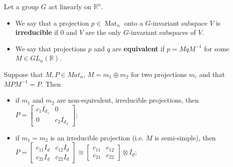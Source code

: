 \begin{frame}
  \begin{definition}
    Let a group $G$ act linearly on $\mathbb{R}^n$.
    \pause
    \begin{itemize}
      \item We say that a projection $p \in \operatorname{Mat}_n$ onto a $G$-invariant subspace $V$ is \textbf{irreducible}
      if $0$ and $V$ are the only $G$-invariant subspaces of $V$.
      \pause
      \item We say that projections $p$ and $q$ are \textbf{equivalent} if $p = MqM^{-1}$ for some $M \in GL_n(\mathbb{R})$.
      \pause
    \end{itemize}
  \end{definition}

  \begin{lemma}[Schur]
  Suppose that $M, P\in Mat_n$, $M = m_1 \oplus m_2$ for two projections $m_i$
  and that $MPM^{-1} = P$. Then \\[-0.2in]
  \begin{itemize}
    \pause
    \item if $m_1$ and $m_2$ are non-equivalent, irreducible projections, then
      $P =
      \begin{bmatrix}
      c_1 I_{d_1} & 0 \\
      0     & c_2 I_{d_2}
      \end{bmatrix}
      $;
    \pause
    \item if $m_1 = m_2$ is an irreducible projection (i.e. $M$ is semi-simple), then
      $P =
      \begin{bmatrix}
      c_{11} I_d & c_{12} I_d \\
      c_{21} I_d & c_{22} I_d
      \end{bmatrix}
      \cong
      \begin{bmatrix}
      c_{11} & c_{12}\\
      c_{21} & c_{22}
      \end{bmatrix}
      \otimes I_d $;
  \end{itemize}
  \end{lemma}


\end{frame}

